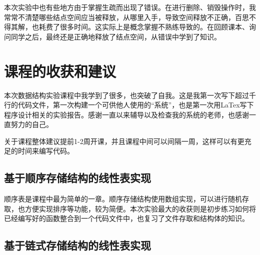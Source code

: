 \documentclass[supercite]{Experimental_Report}
\theoremstyle{definition}
\begin{document}
本次实验中也有些地方由于掌握生疏而出现了错误。在进行删除、销毁操作时，我常常不清楚哪些结点空间应当被释放，从哪里入手，导致空间释放不正确，百思不得其解，也耗费了很多时间。这实际上是概念掌握不熟练导致的。在回顾课本、询问同学之后，最终还是正确地释放了结点空间，从错误中学到了知识。

\newpage

\section{课程的收获和建议}


本次数据结构实验课程中我学到了很多，也突破了自我。这是我第一次写下超过千行的代码文件，第一次构建一个可供他人使用的“系统”，也是第一次用LaTex写下程序设计相关的实验报告。感谢一直以来辅导以及检查我的系统的老师，也感谢一直努力的自己。

关于课程整体建议提前1-2周开课，并且课程中间可以间隔一周，这样可以有更充足的时间来编写代码。

\subsection{基于顺序存储结构的线性表实现}


顺序表是课程中最为简单的一章。顺序存储结构使用数组实现，可以进行随机存取，也方便实现排序等功能，较为简便。本次实验最大的收获则是初步练习如何将已经编写好的函数整合到一个代码文件中，也复习了文件存取和结构体的知识。

\subsection{基于链式存储结构的线性表实现}
\end{document}
